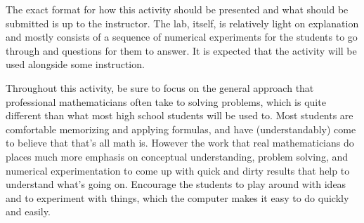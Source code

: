 The exact format for how this activity should be presented and what should be submitted is up to the instructor. The lab, itself, is relatively light on explanation and mostly consists of a sequence of numerical experiments for the students to go through and questions for them to answer. It is expected that the activity will be used alongside some instruction.

Throughout this activity, be sure to focus on the general approach that professional mathematicians often take to solving problems, which is quite different than what most high school students will be used to. Most students are comfortable memorizing and applying formulas, and have (understandably) come to believe that that's all math is. However the work that real mathematicians do places much more emphasis on conceptual understanding, problem solving, and numerical experimentation to come up with quick and dirty results that help to understand what's going on. Encourage the students to play around with ideas and to experiment with things, which the computer makes it easy to do quickly and easily.

